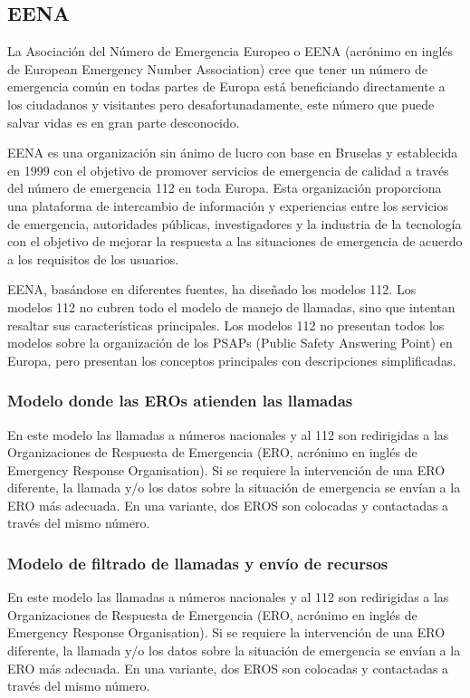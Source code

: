 \subsection{EENA}

La Asociación del Número de Emergencia Europeo o EENA (acrónimo en inglés de European Emergency Number Association) cree que tener un número de emergencia común en todas partes de Europa está beneficiando directamente a los ciudadanos y visitantes pero desafortunadamente, este número que puede salvar vidas es en gran parte desconocido.

EENA es una organización sin ánimo de lucro con base en Bruselas y establecida en 1999 con el objetivo de promover servicios de emergencia de calidad a través del número de emergencia 112 en toda Europa. Esta organización proporciona una plataforma de intercambio de información y experiencias entre los servicios de emergencia, autoridades públicas, investigadores y la industria de la tecnología con el objetivo de mejorar la respuesta a las situaciones de emergencia de acuerdo a los requisitos de los usuarios.

EENA, basándose en diferentes fuentes, ha diseñado los modelos 112. Los modelos 112 no cubren todo el modelo de manejo de llamadas, sino que intentan resaltar sus características principales. Los modelos 112 no presentan todos los modelos sobre la organización de los PSAPs (Public Safety Answering Point) en Europa, pero presentan los conceptos principales con descripciones simplificadas.

\subsubsection{Modelo donde las EROs atienden las llamadas}

En este modelo las llamadas a números nacionales y al 112 son redirigidas a las  Organizaciones de Respuesta de Emergencia (ERO, acrónimo en inglés de Emergency Response Organisation). Si se requiere la intervención de una ERO diferente, la llamada y/o los datos sobre la situación de emergencia se envían a la ERO más adecuada. En una variante, dos EROS son colocadas y contactadas a través del mismo número.

\subsubsection{Modelo de filtrado de llamadas y envío de recursos}

En este modelo las llamadas a números nacionales y al 112 son redirigidas a las  Organizaciones de Respuesta de Emergencia (ERO, acrónimo en inglés de Emergency Response Organisation). Si se requiere la intervención de una ERO diferente, la llamada y/o los datos sobre la situación de emergencia se envían a la ERO más adecuada. En una variante, dos EROS son colocadas y contactadas a través del mismo número.

